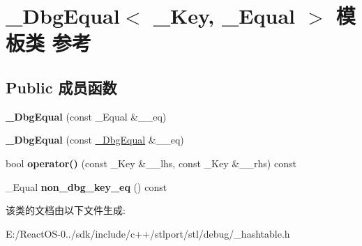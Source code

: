 \hypertarget{class___dbg_equal}{}\section{\+\_\+\+Dbg\+Equal$<$ \+\_\+\+Key, \+\_\+\+Equal $>$ 模板类 参考}
\label{class___dbg_equal}
\subsection*{Public 成员函数}
\begin{DoxyCompactItemize}
\item 
\mbox{\label{class___dbg_equal_ac11716a0d6a62993ba54eb06c118ba35}} 
{\bfseries \+\_\+\+Dbg\+Equal} (const \+\_\+\+Equal \&\+\_\+\+\_\+eq)
\item 
\mbox{\label{class___dbg_equal_a86a9e9cb109ecdf436b8794818772e3f}} 
{\bfseries \+\_\+\+Dbg\+Equal} (const \hyperlink{class___dbg_equal}{\+\_\+\+Dbg\+Equal} \&\+\_\+\+\_\+eq)
\item 
\mbox{\label{class___dbg_equal_aa796467c63f327bf9abe233a20fa128d}} 
bool {\bfseries operator()} (const \+\_\+\+Key \&\+\_\+\+\_\+lhs, const \+\_\+\+Key \&\+\_\+\+\_\+rhs) const
\item 
\mbox{\label{class___dbg_equal_acfcb5d14f6cdc0fea640eceb83bf10fd}} 
\+\_\+\+Equal {\bfseries non\+\_\+dbg\+\_\+key\+\_\+eq} () const
\end{DoxyCompactItemize}


该类的文档由以下文件生成\+:\begin{DoxyCompactItemize}
\item 
E\+:/\+React\+O\+S-\/0../sdk/include/c++/stlport/stl/debug/\+\_\+hashtable.\+h\end{DoxyCompactItemize}
